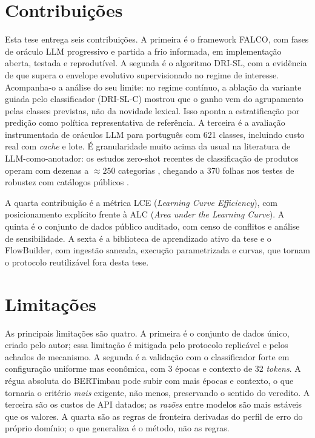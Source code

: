 \section{Contribuições}
\label{sec:conc-contribuicoes}

Esta tese entrega seis contribuições. A primeira é o framework FALCO, com
fases de oráculo LLM progressivo e partida a frio informada, em implementação
aberta, testada e reprodutível. A segunda é o algoritmo DRI-SL, com a
evidência de que supera o envelope evolutivo supervisionado no regime de
interesse. Acompanha-o a análise do seu limite: no regime contínuo, a ablação
da variante guiada pelo classificador (DRI-SL-C) mostrou que o ganho vem do
agrupamento pelas classes previstas, não da novidade lexical. Isso aponta a
estratificação por predição como política representativa de referência. A
terceira é a avaliação instrumentada de oráculos LLM para português com 621
classes, incluindo custo real com \textit{cache} e lote. É granularidade
muito acima da usual na literatura de LLM-como-anotador: os estudos
zero-shot recentes de classificação de produtos operam com dezenas a
$\approx 250$ categorias \citep{Roumeliotis2025}, chegando a 370 folhas
nos testes de robustez com catálogos públicos \citep{Gholamian2024}.

A quarta contribuição é a métrica LCE (\textit{Learning Curve Efficiency}),
com posicionamento explícito frente à ALC (\textit{Area under the Learning
Curve}). A quinta é o conjunto de dados público auditado, com censo de
conflitos e análise de sensibilidade. A sexta é a biblioteca de aprendizado
ativo da tese \citep{DaruActiveLearning} e o FlowBuilder, com ingestão
saneada, execução parametrizada e curvas, que tornam o protocolo
reutilizável fora desta tese.

\section{Limitações}
\label{sec:conc-limitacoes}

As principais limitações são quatro. A primeira é o conjunto de dados único,
criado pelo autor; essa limitação é mitigada pelo protocolo replicável e pelos
achados de mecanismo. A
segunda é a validação com o classificador forte em configuração uniforme mas
econômica, com 3 épocas e contexto de 32 \textit{tokens}. A régua absoluta do BERTimbau pode subir com mais épocas e contexto, o
que tornaria o critério \emph{mais} exigente, não menos, preservando o
sentido do veredito. A terceira são os custos de API datados; as
\emph{razões} entre modelos são mais estáveis que os valores. A quarta são
as regras de fronteira derivadas do perfil de erro do próprio domínio; o que
generaliza é o método, não as regras.

